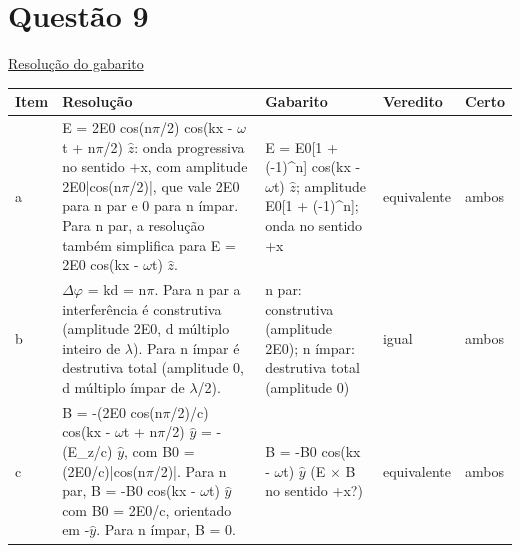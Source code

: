 \documentclass{article}%
\begin{document}
\section*{Questão 9}%
\href{https://poliedroresolve.sistemapoliedro.com.br/vestibulares/ita/2027/ita-2-fase-dia-3-22-10-2026-2-fase-dia-3/dissertativa-9-fisica-2-fase-dia-3-ita-2027}{Resolução do gabarito}\par\smallskip%
\begin{longtable}{@{}p{} p{} p{} p{} p{}@{}}\toprule Item & Resolução & Gabarito & Veredito & Certo \\ \midrule
a & E = 2E0 cos(n$\pi$/2) cos(kx - $\omega$t + n$\pi$/2) $\hat z$: onda progressiva no sentido +x, com amplitude 2E0|cos(n$\pi$/2)|, que vale 2E0 para n par e 0 para n ímpar. Para n par, a resolução também simplifica para E = 2E0 cos(kx - $\omega$t) $\hat z$. & E = E0{[}1 + (-1)\^{}n{]} cos(kx - $\omega$t) $\hat z$; amplitude E0{[}1 + (-1)\^{}n{]}; onda no sentido +x & equivalente & ambos \\
b & $\Delta$$\varphi$ = kd = n$\pi$. Para n par a interferência é construtiva (amplitude 2E0, d múltiplo inteiro de $\lambda$). Para n ímpar é destrutiva total (amplitude 0, d múltiplo ímpar de $\lambda$/2). & n par: construtiva (amplitude 2E0); n ímpar: destrutiva total (amplitude 0) & igual & ambos \\
c & B = -(2E0 cos(n$\pi$/2)/c) cos(kx - $\omega$t + n$\pi$/2) $\hat y$ = -(E\_z/c) $\hat y$, com B0 = (2E0/c)|cos(n$\pi$/2)|. Para n par, B = -B0 cos(kx - $\omega$t) $\hat y$ com B0 = 2E0/c, orientado em -$\hat y$. Para n ímpar, B = 0. & B = -B0 cos(kx - $\omega$t) $\hat y$ (E $\times$ B no sentido +x?) & equivalente & ambos \\
\bottomrule\end{longtable}%
\end{document}
